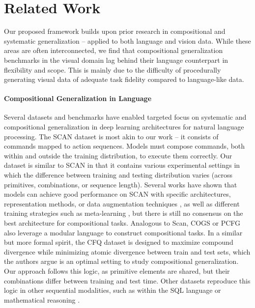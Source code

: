 \section{Related Work}

Our proposed framework builds upon prior research in compositional and systematic generalization -- applied to both language and vision data. While these areas are often interconnected, we find that compositional generalization benchmarks in the visual domain lag behind their language counterpart in flexibility and scope. This is mainly due to the difficulty of procedurally generating visual data of adequate task fidelity compared to language-like data.

\paragraph{Compositional Generalization in Language} Several datasets and benchmarks have enabled targeted focus on systematic and compositional generalization in deep learning architectures for natural language processing. The SCAN dataset \citep{SCAN_lake_baroni} is most akin to our work -- it consists of commands mapped to action sequences. Models must compose commands, both within and outside the training distribution, to execute them correctly. Our dataset is similar to SCAN in that it contains various experimental settings in which the difference between training and testing distribution varies (across primitives, combinations, or sequence length). Several works have shown that models can achieve good performance on SCAN with specific architectures, representation methods, or data augmentation techniques \cite{SCAN_CNN, SCAN_augmentation, SCAN_embedding_augmentation, loula2018rearranging, csordas2021devil}, as well as different training strategies such as meta-learning \cite{lake_baroni_2023}, but there is still no consensus on the best architecture for compositional tasks. Analogous to Scan, COGS \cite{kim2020cogs} or PCFG \cite{hupkes2020compositionality} also leverage a modular language to construct compositional tasks. In a similar but more formal spirit, the CFQ dataset \citep{keysers2019measuring} is designed to maximize compound divergence while minimizing atomic divergence between train and test sets, which the authors argue is an optimal setting to study compositional generalization. Our approach follows this logic, as primitive elements are shared, but their combinations differ between training and test time. Other datasets reproduce this logic in other sequential modalities, such as within the SQL language \cite{finegan2018improvingSQL} or mathematical reasoning \cite{saxton2019analysing}.

